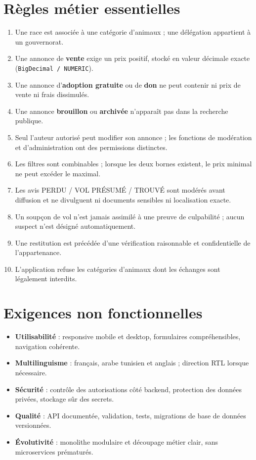 \section{Règles métier essentielles}\label{sec:regles}
\begin{enumerate}[label=\textbf{RG-\arabic*.},leftmargin=12mm]
\item Une race est associée à une catégorie d’animaux ; une délégation appartient à un gouvernorat.
\item Une annonce de \textbf{vente} exige un prix positif, stocké en valeur décimale exacte (\texttt{BigDecimal / NUMERIC}).
\item Une annonce d’\textbf{adoption gratuite} ou de \textbf{don} ne peut contenir ni prix de vente ni frais dissimulés.
\item Une annonce \textbf{brouillon} ou \textbf{archivée} n’apparaît pas dans la recherche publique.
\item Seul l’auteur autorisé peut modifier son annonce ; les fonctions de modération et d’administration ont des permissions distinctes.
\item Les filtres sont combinables ; lorsque les deux bornes existent, le prix minimal ne peut excéder le maximal.
\item Les avis PERDU / VOL PRÉSUMÉ / TROUVÉ sont modérés avant diffusion et ne divulguent ni documents sensibles ni localisation exacte.
\item Un soupçon de vol n’est jamais assimilé à une preuve de culpabilité ; aucun suspect n’est désigné automatiquement.
\item Une restitution est précédée d’une vérification raisonnable et confidentielle de l’appartenance.
\item L’application refuse les catégories d’animaux dont les échanges sont légalement interdits.
\end{enumerate}

\section{Exigences non fonctionnelles}
\begin{itemize}
\item \textbf{Utilisabilité} : responsive mobile et desktop, formulaires compréhensibles, navigation cohérente.
\item \textbf{Multilinguisme} : français, arabe tunisien et anglais ; direction RTL lorsque nécessaire.
\item \textbf{Sécurité} : contrôle des autorisations côté backend, protection des données privées, stockage sûr des secrets.
\item \textbf{Qualité} : API documentée, validation, tests, migrations de base de données versionnées.
\item \textbf{Évolutivité} : monolithe modulaire et découpage métier clair, sans microservices prématurés.
\end{itemize}

